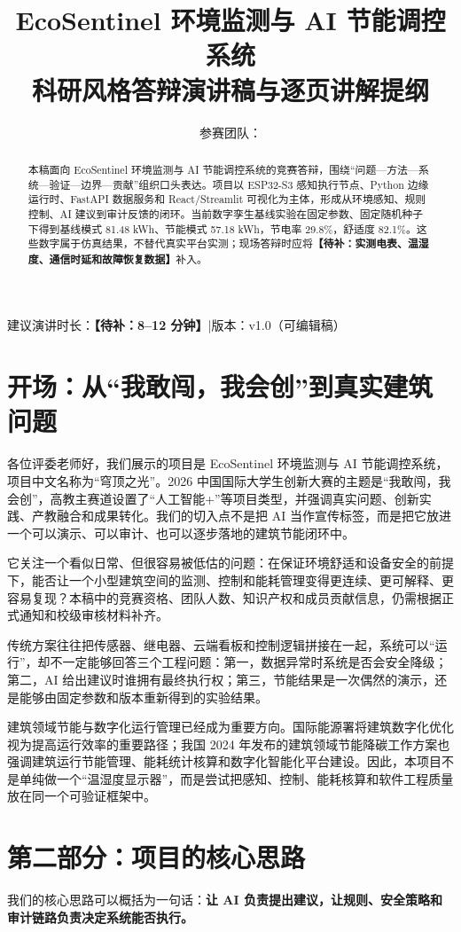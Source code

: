 \documentclass[UTF8,a4paper,zihao=-4]{ctexart}
\title{\vspace{-1cm}\textcolor{EcoNavy}{EcoSentinel 环境监测与 AI 节能调控系统}\\[0.4em]\Large 科研风格答辩演讲稿与逐页讲解提纲}
\author{参赛团队：\placeholder{团队名称、成员与指导教师}}\date{\placeholder{比赛名称与答辩日期}}
\newcommand{\placeholder}[1]{\textcolor{EcoOrange}{\textbf{【待补：#1】}}}
\begin{document}
\maketitle
\begin{center}\small 建议演讲时长：\placeholder{8--12 分钟}\quad |\quad 版本：v1.0（可编辑稿）\end{center}
\begin{abstract}
本稿面向 EcoSentinel 环境监测与 AI 节能调控系统的竞赛答辩，围绕“问题—方法—系统—验证—边界—贡献”组织口头表达。项目以 ESP32-S3 感知执行节点、Python 边缘运行时、FastAPI 数据服务和 React/Streamlit 可视化为主体，形成从环境感知、规则控制、AI 建议到审计反馈的闭环。当前数字孪生基线实验在固定参数、固定随机种子下得到基线模式 81.48 kWh、节能模式 57.18 kWh，节电率 29.8\%，舒适度 82.1\%。这些数字属于仿真结果，不替代真实平台实测；现场答辩时应将\placeholder{实测电表、温湿度、通信时延和故障恢复数据}补入。
\end{abstract}
\section{开场：从“我敢闯，我会创”到真实建筑问题}
各位评委老师好，我们展示的项目是 EcoSentinel 环境监测与 AI 节能调控系统，项目中文名称为“穹顶之光”。2026 中国国际大学生创新大赛的主题是“我敢闯，我会创”，高教主赛道设置了“人工智能+”等项目类型，并强调真实问题、创新实践、产教融合和成果转化。我们的切入点不是把 AI 当作宣传标签，而是把它放进一个可以演示、可以审计、也可以逐步落地的建筑节能闭环中。

它关注一个看似日常、但很容易被低估的问题：在保证环境舒适和设备安全的前提下，能否让一个小型建筑空间的监测、控制和能耗管理变得更连续、更可解释、更容易复现？本稿中的竞赛资格、团队人数、知识产权和成员贡献信息，仍需根据正式通知和校级审核材料补齐。

传统方案往往把传感器、继电器、云端看板和控制逻辑拼接在一起，系统可以“运行”，却不一定能够回答三个工程问题：第一，数据异常时系统是否会安全降级；第二，AI 给出建议时谁拥有最终执行权；第三，节能结果是一次偶然的演示，还是能够由固定参数和版本重新得到的实验结果。

建筑领域节能与数字化运行管理已经成为重要方向。国际能源署将建筑数字化优化视为提高运行效率的重要路径\cite{iea_efficiency_2025}；我国 2024 年发布的建筑领域节能降碳工作方案也强调建筑运行节能管理、能耗统计核算和数字化智能化平台建设\cite{china_building_efficiency_2024}。因此，本项目不是单纯做一个“温湿度显示器”，而是尝试把感知、控制、能耗核算和软件工程质量放在同一个可验证框架中。
\section{第二部分：项目的核心思路}
我们的核心思路可以概括为一句话：\textbf{让 AI 负责提出建议，让规则、安全策略和审计链路负责决定系统能否执行。}
\end{document}
